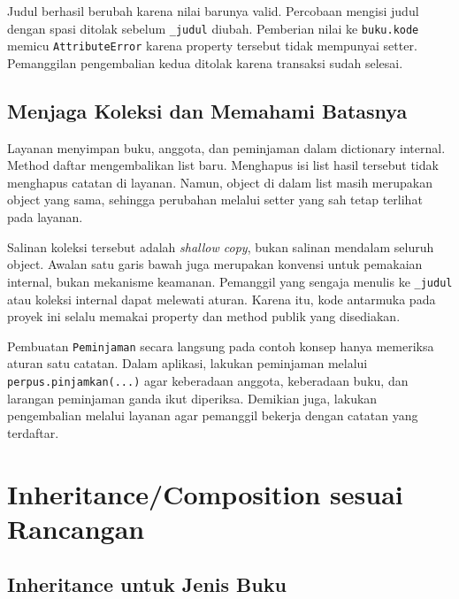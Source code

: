 Judul berhasil berubah karena nilai barunya valid. Percobaan mengisi judul dengan spasi ditolak sebelum \texttt{\_judul} diubah. Pemberian nilai ke \texttt{buku.kode} memicu \texttt{AttributeError} karena property tersebut tidak mempunyai setter. Pemanggilan pengembalian kedua ditolak karena transaksi sudah selesai.

\subsection{Menjaga Koleksi dan Memahami Batasnya}

Layanan menyimpan buku, anggota, dan peminjaman dalam dictionary internal. Method daftar mengembalikan list baru. Menghapus isi list hasil tersebut tidak menghapus catatan di layanan. Namun, object di dalam list masih merupakan object yang sama, sehingga perubahan melalui setter yang sah tetap terlihat pada layanan.

Salinan koleksi tersebut adalah \emph{shallow copy}, bukan salinan mendalam seluruh object. Awalan satu garis bawah juga merupakan konvensi untuk pemakaian internal, bukan mekanisme keamanan. Pemanggil yang sengaja menulis ke \texttt{\_judul} atau koleksi internal dapat melewati aturan. Karena itu, kode antarmuka pada proyek ini selalu memakai property dan method publik yang disediakan.

\begin{penting}
Pembuatan \texttt{Peminjaman} secara langsung pada contoh konsep hanya memeriksa aturan satu catatan. Dalam aplikasi, lakukan peminjaman melalui \texttt{perpus.pinjamkan(...)} agar keberadaan anggota, keberadaan buku, dan larangan peminjaman ganda ikut diperiksa. Demikian juga, lakukan pengembalian melalui layanan agar pemanggil bekerja dengan catatan yang terdaftar.
\end{penting}

\section{Inheritance/Composition sesuai Rancangan}

\subsection{Inheritance untuk Jenis Buku}

